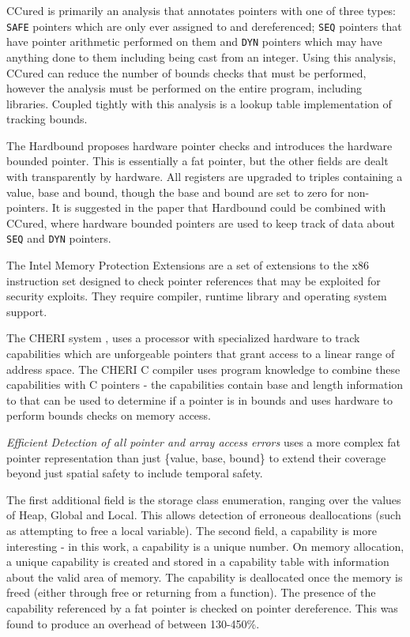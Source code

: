 CCured \cite{necula2002ccured} is primarily an analysis that annotates pointers with one of three types: \verb!SAFE! pointers which are only ever assigned to and dereferenced; \verb!SEQ! pointers that have pointer arithmetic performed on them and \verb!DYN! pointers which may have anything done to them including being cast from an integer.
Using this analysis, CCured can reduce the number of bounds checks that must be performed, however the analysis must be performed on the entire program, including libraries.
Coupled tightly with this analysis is a lookup table implementation of tracking bounds.

The Hardbound \cite{devietti2008hardbound} proposes hardware pointer checks and introduces the hardware bounded pointer. This is essentially a fat pointer, but the other fields are dealt with transparently by hardware.
All registers are upgraded to triples containing a value, base and bound, though the base and bound are set to zero for non-pointers.
It is suggested in the paper that Hardbound could be combined with CCured, where hardware bounded pointers are used to keep track of data about \verb!SEQ! and \verb!DYN! pointers.

The Intel Memory Protection Extensions \cite{mpx,intelMpxSpec} are a set of extensions to the x86 instruction set designed to check pointer references that may be exploited for security exploits.
They require compiler, runtime library and operating system support.

The CHERI system \cite{cheri}, uses a processor with specialized hardware to track capabilities which are unforgeable pointers that grant access to a linear range of address space.
The CHERI C compiler uses program knowledge to combine these capabilities with C pointers - the capabilities contain base and length information to that can be used to determine if a pointer is in bounds and uses hardware to perform bounds checks on memory access.

\textit{Efficient Detection of all pointer and array access errors} \cite{austin1994efficient} uses a more complex fat pointer representation than just \{value, base, bound\} to extend their coverage beyond just spatial safety to include temporal safety.

The first additional field is the storage class enumeration, ranging over the values of Heap, Global and Local.
This allows detection of erroneous deallocations (such as attempting to free a local variable).
The second field, a capability is more interesting - in this work, a capability is a unique number.
On memory allocation, a unique capability is created and stored in a capability table with information about the valid area of memory.
The capability is deallocated once the memory is freed (either through free or returning from a function).
The presence of the capability referenced by a fat pointer is checked on pointer dereference.
This was found to produce an overhead of between 130-450\%.

